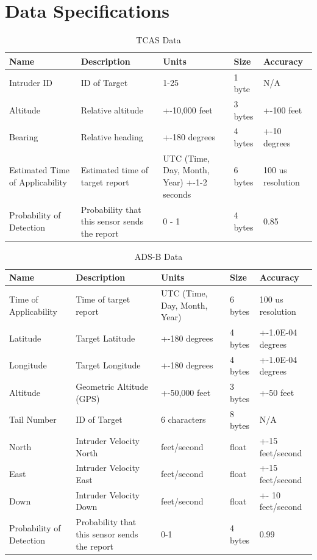 \documentclass[12pt,oneside,letterpaper]{article}
\begin{document}
\section{Data Specifications}
\begin{table}[H]
\caption{TCAS Data}
\centering
\begin{tabular}{|p{}|p{}|p{}|p{}|p{}|}
 \hline
 Name & Description & Units & Size & Accuracy \\
 \hline
 Intruder ID & ID of Target & 1-25 & 1 byte & N/A \\
 \hline
 Altitude & Relative altitude & +-10,000 feet & 3 bytes & +-100 feet \\
 \hline
 Bearing & Relative heading & +-180 degrees & 4 bytes &  +-10 degrees \\
 \hline
 Estimated Time of Applicability & Estimated time of target report & UTC (Time, Day, Month, Year) +-1-2 seconds & 6 bytes & 100 us resolution \\
 \hline
 Probability of Detection & Probability that this sensor sends the report & 0 - 1 & 4 bytes & 0.85 \\
 \hline
\end{tabular}
\end{table}

\begin{table}[H]
\caption{ADS-B Data}
\centering
\begin{tabular}{|p{}|p{}|p{}|p{}|p{}|}
 \hline
 Name & Description & Units & Size & Accuracy \\
 \hline
 Time of Applicability & Time of target report & UTC (Time, Day, Month, Year) & 6 bytes & 100 us resolution\\
 \hline
 Latitude & Target Latitude & +-180 degrees & 4 bytes & +-1.0E-04 degrees \\
 \hline
 Longitude & Target Longitude & +-180 degrees & 4 bytes & +-1.0E-04 degrees \\
 \hline
 Altitude & Geometric Altitude (GPS) & +-50,000 feet & 3 bytes & +-50 feet \\
 \hline
 Tail Number & ID of Target & 6 characters & 8 bytes & N/A \\
 \hline
 North & Intruder Velocity North & feet/second & float & +-15 feet/second \\
 \hline
 East & Intruder Velocity East & feet/second & float & +-15 feet/second \\
 \hline
 Down & Intruder Velocity Down & feet/second & float & +- 10 feet/second \\
 \hline
 Probability of Detection & Probability that this sensor sends the report & 0-1 & 4 bytes & 0.99 \\
 \hline
\end{tabular}
\end{table}
\end{document}
